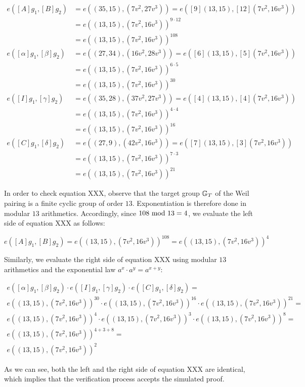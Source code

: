 \begin{example}
\begin{align*}
e([A]g_1,[B]g_2) & = e((35,15),(7v^2,27v^3))
                   = e([9](13,15),[12](7v^2,16v^3))\\
               & = e((13,15),(7v^2,16v^3))^{9\cdot 12}\\
               & = e((13,15),(7v^2,16v^3))^{108}\\
e([\alpha]g_1,[\beta]g_2) & = e((27,34),(16v^2,28v^3)) 
                            = e([6](13,15),[5](7v^2,16v^3))\\
               & = e((13,15),(7v^2,16v^3))^{6\cdot 5}\\
               & = e((13,15),(7v^2,16v^3))^{30}\\   
e([I]g_1,[\gamma]g_2) & = e((35,28),(37v^2,27v^3)) 
                            = e([4](13,15),[4](7v^2,16v^3))\\
               & = e((13,15),(7v^2,16v^3))^{4\cdot 4}\\
               & = e((13,15),(7v^2,16v^3))^{16}\\ 
e([C]g_1,[\delta]g_2) & = e((27,9),(42v^2,16v^3)) 
                            = e([7](13,15),[3](7v^2,16v^3))\\
               & = e((13,15),(7v^2,16v^3))^{7\cdot 3}\\
               & = e((13,15),(7v^2,16v^3))^{21}
\end{align*}  

In order to check equation XXX, observe that the target group $\mathbb{G}_T$ of the Weil pairing is a finite cyclic group of order $13$. Exponentiation is therefore done in modular $13$ arithmetics. Accordingly, since $108 \text{ mod } 13=4$, we evaluate the left side of equation XXX as follows:

$$
e([A]g_1,[B]g_2) = e((13,15),(7v^2,16v^3))^{108} =e((13,15),(7v^2,16v^3))^{4}
$$

Similarly, we evaluate the right side of equation XXX using modular $13$ arithmetics and the exponential law $a^x\cdot a^y = a^{x+y}$:

\begin{align*}
e([\alpha]g_1,[\beta]g_2)\cdot e([I]g_1,[\gamma]g_2)\cdot e([C]g_1,[\delta]g_2) =\\
e((13,15),(7v^2,16v^3))^{30}\cdot e((13,15),(7v^2,16v^3))^{16}\cdot e((13,15),(7v^2,16v^3))^{21} =\\
e((13,15),(7v^2,16v^3))^{4}\cdot e((13,15),(7v^2,16v^3))^{3}\cdot e((13,15),(7v^2,16v^3))^{8} =\\
e((13,15),(7v^2,16v^3))^{4+3+8} = \\
e((13,15),(7v^2,16v^3))^{2}
\end{align*}

As we can see, both the left and the right side of equation XXX are identical, which implies that the verification process accepts the simulated proof.


\end{example}

